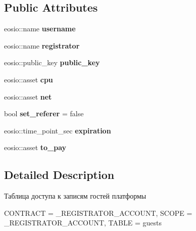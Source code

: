\subsection*{Public Attributes}
\begin{DoxyCompactItemize}
\item 
\mbox{\label{structp2p_1_1guests_a2063eb8b622bad86da024019a9be0996}} 
eosio\+::name {\bfseries username}
\item 
\mbox{\label{structp2p_1_1guests_a7d81b8f733dfeea21966a8a31edb301d}} 
eosio\+::name {\bfseries registrator}
\item 
\mbox{\label{structp2p_1_1guests_a4b73f584111d94b3a6fb5622d8216ed3}} 
eosio\+::public\+\_\+key {\bfseries public\+\_\+key}
\item 
\mbox{\label{structp2p_1_1guests_a09bbcdc724ea96a5cdf347367b4f7041}} 
eosio\+::asset {\bfseries cpu}
\item 
\mbox{\label{structp2p_1_1guests_aff18f2163f3b24aea4575794e55425b4}} 
eosio\+::asset {\bfseries net}
\item 
\mbox{\label{structp2p_1_1guests_a395b94e26a5cfdd479d740f626f12180}} 
bool {\bfseries set\+\_\+referer} = false
\item 
\mbox{\label{structp2p_1_1guests_ad45fc1ab56a406b0459e2800370b35e1}} 
eosio\+::time\+\_\+point\+\_\+sec {\bfseries expiration}
\item 
\mbox{\label{structp2p_1_1guests_ac8da955e150475f48c17508b45c097c9}} 
eosio\+::asset {\bfseries to\+\_\+pay}
\end{DoxyCompactItemize}


\subsection{Detailed Description}
Таблица доступа к записям гостей платформы 

C\+O\+N\+T\+R\+A\+CT = \+\_\+\+R\+E\+G\+I\+S\+T\+R\+A\+T\+O\+R\+\_\+\+A\+C\+C\+O\+U\+NT, S\+C\+O\+PE = \+\_\+\+R\+E\+G\+I\+S\+T\+R\+A\+T\+O\+R\+\_\+\+A\+C\+C\+O\+U\+NT, T\+A\+B\+LE = guests

